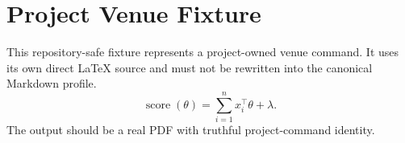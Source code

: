 \documentclass[11pt]{article}
\begin{document}
\section*{Project Venue Fixture}
This repository-safe fixture represents a project-owned venue command. It uses
its own direct \LaTeX{} source and must not be rewritten into the canonical
Markdown profile.
\[
\operatorname{score}(\theta) = \sum_{i=1}^{n} x_i^\top \theta + \lambda.
\]
The output should be a real PDF with truthful project-command identity.
\end{document}
